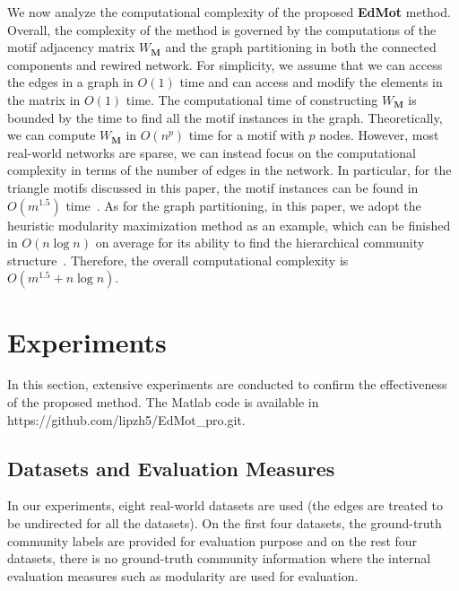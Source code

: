 \documentclass[sigconf]{acmart}
\begin{document}
We now analyze the computational complexity of the proposed \textbf{EdMot} method. Overall, the complexity of the method is governed by the computations of the motif adjacency matrix $W_{\mathbf{M}}$ and the graph partitioning in both the connected components and rewired network. For simplicity, we assume that we can access the edges in a graph in $O(1)$ time and can access and modify the elements in the matrix in $O(1)$ time. The computational time of constructing $W_{\mathbf{M}}$ is bounded by the time to find all the motif instances in the graph. Theoretically, we can compute $W_{\mathbf{M}}$ in $O(n^{p})$ time for a motif with $p$ nodes. However, most real-world networks are sparse, we can instead focus on the computational complexity in terms of the number of edges in the network. In particular, for the triangle motifs discussed in this paper, the motif instances can be found in $O(m^{1.5})$ time~\cite{latapy2008main,Berry2014Why,benson2016higher}. As for the graph partitioning, in this paper, we adopt the heuristic modularity maximization method as an example, which can be finished in $O(n\log n)$ on average for its ability to find the hierarchical community structure~\cite{Vincent2008Fast}. Therefore, the overall computational complexity is $O(m^{1.5}+n\log n)$.

\section{Experiments}
\label{sec:experiments}
In this section, extensive experiments are conducted to confirm the effectiveness of the proposed method. The Matlab code is available in https://github.com/lipzh5/EdMot\_pro.git.

\subsection{Datasets and Evaluation Measures}

In our experiments, eight real-world datasets are used (the edges are treated to be undirected for all the datasets). On the first four datasets, the ground-truth community labels are provided for evaluation purpose and on the rest four datasets, there is no ground-truth community information where the internal evaluation measures such as modularity are used for evaluation. 
\end{document}
